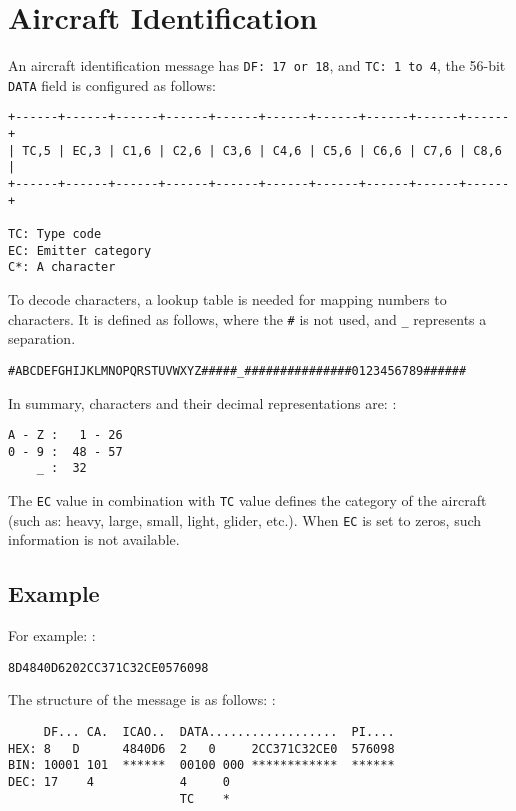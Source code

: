 \section{Aircraft Identification}\label{aircraft-identification}

An aircraft identification message has \texttt{DF:\ 17\ or\ 18}, and \texttt{TC:\ 1\ to\ 4}, the 56-bit \texttt{DATA} field is configured as follows:

\begin{verbatim}
+------+------+------+------+------+------+------+------+------+------+
| TC,5 | EC,3 | C1,6 | C2,6 | C3,6 | C4,6 | C5,6 | C6,6 | C7,6 | C8,6 |
+------+------+------+------+------+------+------+------+------+------+

TC: Type code
EC: Emitter category
C*: A character
\end{verbatim}

To decode characters, a lookup table is needed for mapping numbers to characters. It is defined as follows, where the \texttt{\#} is not used, and \texttt{\_} represents a separation.

\begin{verbatim}
#ABCDEFGHIJKLMNOPQRSTUVWXYZ#####_###############0123456789######
\end{verbatim}

In summary, characters and their decimal representations are: :

\begin{verbatim}
A - Z :   1 - 26
0 - 9 :  48 - 57
    _ :  32
\end{verbatim}

The \texttt{EC} value in combination with \texttt{TC} value defines the category of the aircraft (such as: heavy, large, small, light, glider, etc.). When \texttt{EC} is set to zeros, such information is not available.

\subsection{Example}\label{example}

For example: :

\begin{verbatim}
8D4840D6202CC371C32CE0576098
\end{verbatim}

The structure of the message is as follows: :

\begin{verbatim}
     DF... CA.  ICAO..  DATA..................  PI....
HEX: 8   D      4840D6  2   0     2CC371C32CE0  576098
BIN: 10001 101  ******  00100 000 ************  ******
DEC: 17    4            4     0
                        TC    *
\end{verbatim}


